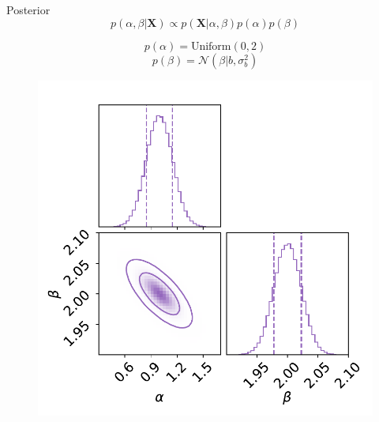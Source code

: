 \documentclass[
aspectratio=169,
14pt,
professionalfonts
]{beamer}
\begin{document}
\begin{frame}{Posterior}
\vspace{-1cm}
    $$p(\alpha, \beta|\boldsymbol{X}) \propto p(\boldsymbol{X}|\alpha, \beta) p(\alpha)p(\beta)$$
    \begin{minipage}{0.4\linewidth}
        $$p(\alpha) = \text{Uniform}(0,2)$$
        $$p(\beta) = \mathcal{N}(\beta | b, \sigma_{b}^2)$$
    \end{minipage}
    \begin{minipage}{0.59\linewidth}
    \begin{figure}
        \centering
        \includegraphics[width=0.8\linewidth]{../plots/posterior.pdf}
    \end{figure}
    \end{minipage}
\end{frame}
\end{document}
